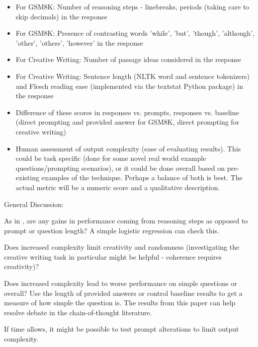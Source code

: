 \documentclass[11pt]{article}
\begin{document}
\begin{itemize}
  \item For GSM8K: Number of reasoning steps - linebreaks, periods (taking care to skip decimals) in the response \cite{fu_complexity-based_2023}
  \item For GSM8K: Presence of contrasting words {'while', 'but', 'though', 'although', 'other', 'others', 'however'} in the response \cite{bhaskar_prompted_2023}
  \item For Creative Writing: Number of passage ideas considered in the response
  \item For Creative Writing: Sentence length (NLTK word and sentence tokenizers) and Flesch reading ease (implemented via the textstat Python package) in the response \cite{noauthor_nltk_nodate, flesch_how_2016, aggarwal_textstat_nodate}
  \item Difference of these scores in responses vs. prompts, responses vs. baseline (direct prompting and provided answer for GSM8K, direct prompting for creative writing)
  \item Human assessment of output complexity (ease of evaluating results). This could be task specific (done for some novel real world example questions/prompting scenarios), or it could be done overall based on pre-existing examples of the technique. Perhaps a balance of both is best. The actual metric will be a numeric score and a qualitative description.
\end{itemize}

General Discussion:

As in \citealp{fu_complexity-based_2023}, are any gains in performance coming from reasoning steps as opposed to prompt or question length? A simple logistic regression can check this.

Does increased complexity limit creativity and randomness (investigating the creative writing task in particular might be helpful - coherence requires creativity)? 

Does increased complexity lead to worse performance on simple questions or overall? Use the length of provided answers or control baseline results to get a measure of how simple the question is. The results from this paper can help resolve debate in the chain-of-thought literature. \cite{fu_complexity-based_2023, shum_automatic_2023}

If time allows, it might be possible to test prompt alterations to limit output complexity. \cite{pu_chatgpt_2023, imperial_flesch_2023}
\end{document}
